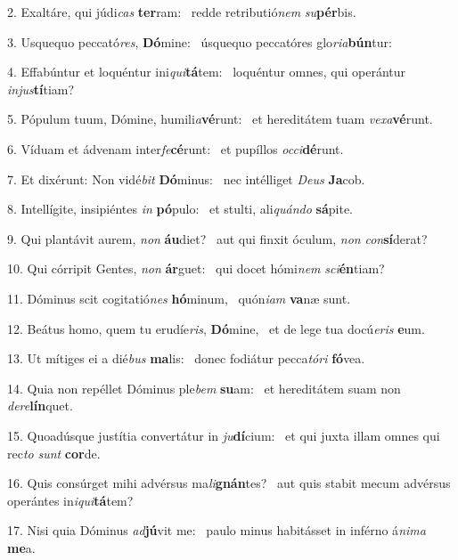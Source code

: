 2. Exaltáre, qui júdi\textit{cas} \textbf{ter}ram: \ast\  redde retributió\textit{nem} \textit{su}\textbf{pér}bis.\

3. Usquequo peccató\textit{res}, \textbf{Dó}mine: \ast\  úsquequo peccatóres glo\textit{ri}\textit{a}\textbf{bún}tur:\

4. Effabúntur et loquéntur ini\textit{qui}\textbf{tá}tem: \ast\  loquéntur omnes, qui operántur \textit{in}\textit{jus}\textbf{tí}tiam?\

5. Pópulum tuum, Dómine, humili\textit{a}\textbf{vé}runt: \ast\  et hereditátem tuam \textit{ve}\textit{xa}\textbf{vé}runt.\

6. Víduam et ádvenam inter\textit{fe}\textbf{cé}runt: \ast\  et pupíllos \textit{oc}\textit{ci}\textbf{dé}runt.\

7. Et dixérunt: Non vidé\textit{bit} \textbf{Dó}minus: \ast\  nec intélliget \textit{De}\textit{us} \textbf{Ja}cob.\

8. Intellígite, insipiéntes \textit{in} \textbf{pó}pulo: \ast\  et stulti, ali\textit{quán}\textit{do} \textbf{sá}pite.\

9. Qui plantávit aurem, \textit{non} \textbf{áu}diet? \ast\  aut qui finxit óculum, \textit{non} \textit{con}\textbf{sí}derat?\

10. Qui córripit Gentes, \textit{non} \textbf{ár}guet: \ast\  qui docet hómi\textit{nem} \textit{sci}\textbf{én}tiam?\

11. Dóminus scit cogitatió\textit{nes} \textbf{hó}minum, \ast\  quón\textit{i}\textit{am} \textbf{va}næ sunt.\

12. Beátus homo, quem tu erudíe\textit{ris}, \textbf{Dó}mine, \ast\  et de lege tua docú\textit{e}\textit{ris} \textbf{e}um.\

13. Ut mítiges ei a dié\textit{bus} \textbf{ma}lis: \ast\  donec fodiátur pecca\textit{tó}\textit{ri} \textbf{fó}vea.\

14. Quia non repéllet Dóminus ple\textit{bem} \textbf{su}am: \ast\  et hereditátem suam non \textit{de}\textit{re}\textbf{lín}quet.\

15. Quoadúsque justítia convertátur in \textit{ju}\textbf{dí}cium: \ast\  et qui juxta illam omnes qui rec\textit{to} \textit{sunt} \textbf{cor}de.\

16. Quis consúrget mihi advérsus ma\textit{li}\textbf{gnán}tes? \ast\  aut quis stabit mecum advérsus operántes in\textit{i}\textit{qui}\textbf{tá}tem?\

17. Nisi quia Dóminus \textit{ad}\textbf{jú}vit me: \ast\  paulo minus habitásset in inférno á\textit{ni}\textit{ma} \textbf{me}a.\

